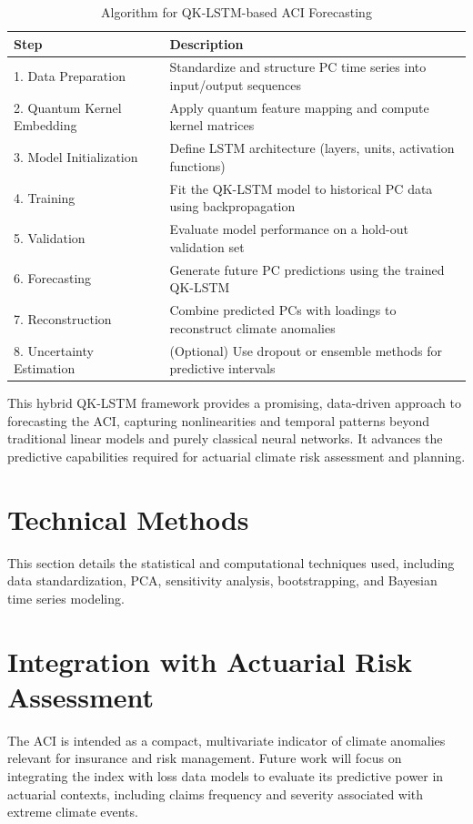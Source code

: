 \documentclass[12pt,a4paper]{report}
\begin{document}
\begin{table}[H]
\centering
\renewcommand{\arraystretch}{1}
\setlength{\tabcolsep}{15pt}
\begin{tabular}{ll}
\hline
\textbf{Step} & \textbf{Description} \\
\hline
1. Data Preparation & Standardize and structure PC time series into input/output sequences \\
2. Quantum Kernel Embedding & Apply quantum feature mapping and compute kernel matrices \\
3. Model Initialization & Define LSTM architecture (layers, units, activation functions) \\
4. Training & Fit the QK-LSTM model to historical PC data using backpropagation \\
5. Validation & Evaluate model performance on a hold-out validation set \\
6. Forecasting & Generate future PC predictions using the trained QK-LSTM \\
7. Reconstruction & Combine predicted PCs with loadings to reconstruct climate anomalies \\
8. Uncertainty Estimation & (Optional) Use dropout or ensemble methods for predictive intervals \\
\hline
\end{tabular}
\caption{Algorithm for QK-LSTM-based ACI Forecasting}
\label{tab:lstm_algorithm}
\end{table}

This hybrid QK-LSTM framework provides a promising, data-driven approach to forecasting the ACI, capturing nonlinearities and temporal patterns beyond traditional linear models and purely classical neural networks. It advances the predictive capabilities required for actuarial climate risk assessment and planning.

\section{Technical Methods}
This section details the statistical and computational techniques used, including data standardization, PCA, sensitivity analysis, bootstrapping, and Bayesian time series modeling.

\section{Integration with Actuarial Risk Assessment}
The ACI is intended as a compact, multivariate indicator of climate anomalies relevant for insurance and risk management. Future work will focus on integrating the index with loss data models to evaluate its predictive power in actuarial contexts, including claims frequency and severity associated with extreme climate events.
\end{document}
